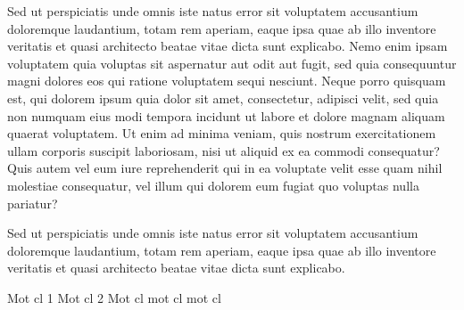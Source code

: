\documentclass{article}
\begin{document}
	\begin{myabstract}[french]
	Sed ut perspiciatis unde omnis iste natus error sit voluptatem accusantium doloremque laudantium, totam rem aperiam, eaque ipsa quae ab illo inventore veritatis et quasi architecto beatae vitae dicta sunt explicabo. Nemo enim ipsam voluptatem quia voluptas sit aspernatur aut odit aut fugit, sed quia consequuntur magni dolores eos qui ratione voluptatem sequi nesciunt. Neque porro quisquam est, qui dolorem ipsum quia dolor sit amet, consectetur, adipisci velit, sed quia non numquam eius modi tempora incidunt ut labore et dolore magnam aliquam quaerat voluptatem. Ut enim ad minima veniam, quis nostrum exercitationem ullam corporis suscipit laboriosam, nisi ut aliquid ex ea commodi consequatur? Quis autem vel eum iure reprehenderit qui in ea voluptate velit esse quam nihil molestiae consequatur, vel illum qui dolorem eum fugiat quo voluptas nulla pariatur?

		\begin{mylaysummary}
		Sed ut perspiciatis unde omnis iste natus error sit voluptatem accusantium doloremque laudantium, totam rem aperiam, eaque ipsa quae ab illo inventore veritatis et quasi architecto beatae vitae dicta sunt explicabo.
		\end{mylaysummary}
		
		\begin{mykeywords}
			\mykeyword Mot cl  1
			\mykeyword Mot cl  2
			\mykeyword Mot cl  mot cl  mot cl 
		\end{mykeywords}
		
	\end{myabstract}
	\mytoc
	
\end{document}
